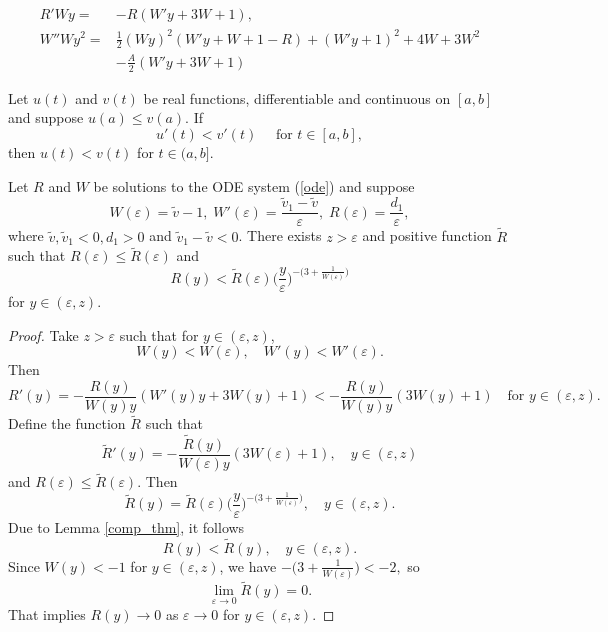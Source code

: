 \documentclass[10pt,a4paper]{amsart}
\begin{document}
\begin{equation}\label{ode}
\begin{split}
R'Wy =&-R(W'y+3W+1),\\
W''Wy^2 =&\frac{1}{2}(Wy)^2(W'y+W+1-R)+(W'y+1)^2+4W+3W^2\\
& -\frac{A}{2}(W'y+3W+1)
\end{split}
\end{equation}

\begin{lemma}\label{comp_thm}
Let $u(t)$ and $v(t)$ be real functions, differentiable and continuous on $[a,b]$ and suppose $u(a)\leq v(a)$. If 
\[u'(t)<v'(t) \quad \text{ for } t\in[a,b],\]
then $u(t)<v(t)$ for $t\in(a,b].$
\end{lemma}

\begin{proposition}\label{thm:Rvac}
Let $R$ and $W$ be solutions to the ODE system (\ref{ode}) and suppose
\[W(\varepsilon)=\tilde{v}-1,\; W'(\varepsilon)=\frac{\tilde{v}_1-\tilde{v}}{\varepsilon},\; R(\varepsilon)=\frac{d_1}{\varepsilon},\]
where 
$ \tilde{v},\tilde{v}_1<0,d_1>0$ and $\tilde{v}_1-\tilde{v}<0$. There exists $z>\varepsilon$ and positive function $\tilde{R}$ such that $R(\varepsilon)\leq \tilde{R}(\varepsilon)$ and 
\[R(y)<\tilde{R}(\varepsilon)\Big(\frac{y}{\varepsilon}\Big)^{-\big(3+\frac{1}{W(\varepsilon)}\big)}\]
for $y\in(\varepsilon,z)$.
\end{proposition}

\begin{proof}
Take $z>\varepsilon$ such that for $y\in(\varepsilon,z)$,
\[W(y)<W(\varepsilon),\quad W'(y)<W'(\varepsilon).\]
Then
\[R'(y)=-\frac{R(y)}{W(y)y}(W'(y)y+3W(y)+1)<-\frac{R(y)}{W(y)y}(3W(y)+1)  \quad \text{for } y\in(\varepsilon,z).\]
Define the function $\tilde{R}$ such that
\[\tilde{R}'(y)=-\frac{\tilde{R}(y)}{W(\varepsilon)y}(3W(\varepsilon)+1),\quad y\in(\varepsilon,z)\]
and $R(\varepsilon)\leq\tilde{R}(\varepsilon).$
Then
\[\tilde{R}(y)=\tilde{R}(\varepsilon)\Big(\frac{y}{\varepsilon}\Big)^{-\big(3+\frac{1}{W(\varepsilon)}\big)},\quad y\in(\varepsilon,z).\]
Due to Lemma \ref{comp_thm}, it follows 
\[R(y)<\tilde{R}(y),\quad y\in(\varepsilon,z).\]
Since $W(y)<-1$ for $y\in(\varepsilon,z)$, we have $-\big(3+\frac{1}{W(\varepsilon)}\big)<-2,$
so
\[\lim_{\varepsilon\to 0}\tilde{R}(y)=0.\]
That implies $R(y)\to 0$ as $\varepsilon\to 0$ for $y\in(\varepsilon,z).$
\end{proof}
\end{document}
